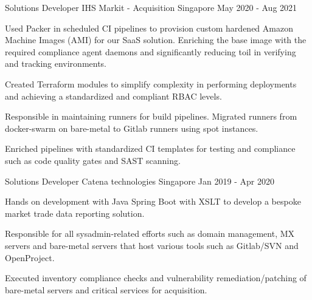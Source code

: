 \begin{cventries}

  \cventry
  {Solutions Developer} %
  {IHS Markit - Acquisition} %
  {Singapore} %
  {May 2020 - Aug 2021} %
  {
    \begin{cvitems} %
      \item {Used Packer in scheduled CI pipelines to provision custom hardened Amazon Machine Images (AMI) for our SaaS solution. Enriching the base image with the required compliance agent daemons and significantly reducing toil in verifying and tracking environments.}
      \item {Created Terraform modules to simplify complexity in performing deployments and achieving a standardized and compliant RBAC levels.}
      \item {Responsible in maintaining runners for build pipelines. Migrated runners from docker-swarm on bare-metal to Gitlab runners using spot instances.}
      \item {Enriched pipelines with standardized CI templates for testing and compliance such as code quality gates and SAST scanning.}
    \end{cvitems}
  }



  \cventry
  {Solutions Developer} %
  {Catena technologies} %
  {Singapore} %
  {Jan 2019 - Apr 2020} %
  {
    \begin{cvitems} %
      \item {Hands on development with Java Spring Boot with XSLT to develop a bespoke market trade data reporting solution.}
      \item {Responsible for all sysadmin-related efforts such as domain management, MX servers and bare-metal servers that host various tools such as Gitlab/SVN and OpenProject.}
      \item {Executed inventory compliance checks and vulnerability remediation/patching of bare-metal servers and critical services for acquisition.}
    \end{cvitems}
  }

\end{cventries}
